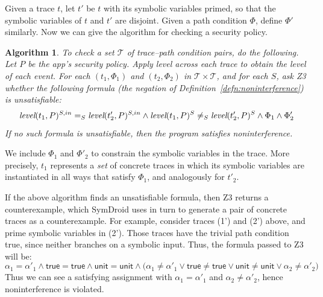 \documentclass{llncs}
\newcommand{\code}[1]{\textsf{#1}} %
\newtheorem{algorithm}{Algorithm}
\newcommand{\sfmt}[1]{\textsf{#1}}
\newcommand{\sunit}{\sfmt{unit}}
\newcommand{\tr}{t\xspace}
\newcommand{\tset}{\ensuremath{\mathcal{T}}\xspace}
\newcommand{\tleveltr}[2]{\textit{level}(#1, #2)}
\begin{document}
Given a trace
$t$, let $t'$ be $t$ with its symbolic variables primed, so that the
symbolic variables of $t$ and $t'$ are disjoint. Given a path
condition $\Phi$, define $\Phi'$ similarly. Now we can give the
algorithm for checking a security policy.

\begin{algorithm}
  To check a set $\tset$ of trace--path condition pairs, do the
  following. Let $P$ be the app's security policy. Apply \emph{level}
  across each trace to obtain the level of each event.  For each
  $(t_1, \Phi_1)$ and $(t_2, \Phi_2)$ in $\tset\times\tset$, and for
  each $S$, ask Z3 whether the following formula (the negation of
  Definition~\ref{defn:noninterference}) is unsatisfiable:
  \begin{displaymath}
    \tleveltr{\tr_1}{P}^{S,in} =_S \tleveltr{\tr_2'}{P}^{S,in} \land
    \tleveltr{\tr_1}{P}^S \neq_S \tleveltr{\tr_2'}{P}^S \land
    \Phi_1 \land \Phi_2' \\
  \end{displaymath}
  If no such formula is unsatisfiable, then the program satisfies noninterference.
\end{algorithm}
%
We include $\Phi_1$ and $\Phi'_2$ to
constrain the symbolic variables in the trace. More precisely,
$\tr_1$ represents a \emph{set} of concrete traces in which its symbolic
variables are instantiated in all ways that satisfy $\Phi_1$,
and analogously for $\tr'_2$.

If the above algorithm finds an unsatisfiable formula, then Z3 returns a counterexample, which
SymDroid uses in turn to generate a pair of concrete traces
as a counterexample.
For example, consider traces (1') and (2') above, and prime
symbolic variables in (2'). Those traces have the trivial path
condition \sfmt{true}, since neither branches on a symbolic
input. Thus, the formula passed to Z3 will be:
\begin{displaymath}
  \alpha_1 = \alpha'_1 \land \code{true} = \code{true} \land \sunit = \sunit
  \land
  \big(\alpha_1 \neq \alpha'_1 \vee \code{true} \neq \code{true} \vee
  \sunit \neq \sunit \vee \alpha_2 \neq \alpha'_2 \big)
\end{displaymath}
Thus we can see a satisfying
assignment with $\alpha_1 = \alpha'_1$ and $\alpha_2 \neq \alpha'_2$,
hence noninterference is violated.
\end{document}
